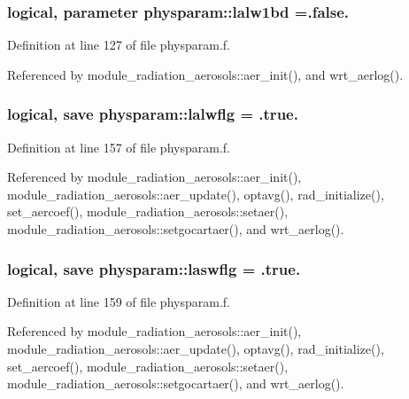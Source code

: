 \subsubsection[{\texorpdfstring{lalw1bd}{lalw1bd}}]{\setlength{\rightskip}{0pt plus 5cm}logical, parameter physparam\+::lalw1bd =.false.}\hypertarget{namespacephysparam_a7ca56a779d7583fcd17b538bf6eb8a84}{}\label{namespacephysparam_a7ca56a779d7583fcd17b538bf6eb8a84}


Definition at line 127 of file physparam.\+f.



Referenced by module\+\_\+radiation\+\_\+aerosols\+::aer\+\_\+init(), and wrt\+\_\+aerlog().

\subsubsection[{\texorpdfstring{lalwflg}{lalwflg}}]{\setlength{\rightskip}{0pt plus 5cm}logical, save physparam\+::lalwflg = .true.}\hypertarget{namespacephysparam_aeec2f09912564e297253bf32bf362928}{}\label{namespacephysparam_aeec2f09912564e297253bf32bf362928}


Definition at line 157 of file physparam.\+f.



Referenced by module\+\_\+radiation\+\_\+aerosols\+::aer\+\_\+init(), module\+\_\+radiation\+\_\+aerosols\+::aer\+\_\+update(), optavg(), rad\+\_\+initialize(), set\+\_\+aercoef(), module\+\_\+radiation\+\_\+aerosols\+::setaer(), module\+\_\+radiation\+\_\+aerosols\+::setgocartaer(), and wrt\+\_\+aerlog().

\subsubsection[{\texorpdfstring{laswflg}{laswflg}}]{\setlength{\rightskip}{0pt plus 5cm}logical, save physparam\+::laswflg = .true.}\hypertarget{namespacephysparam_aed1b9ce25d416e9149353f2075030bfa}{}\label{namespacephysparam_aed1b9ce25d416e9149353f2075030bfa}


Definition at line 159 of file physparam.\+f.



Referenced by module\+\_\+radiation\+\_\+aerosols\+::aer\+\_\+init(), module\+\_\+radiation\+\_\+aerosols\+::aer\+\_\+update(), optavg(), rad\+\_\+initialize(), set\+\_\+aercoef(), module\+\_\+radiation\+\_\+aerosols\+::setaer(), module\+\_\+radiation\+\_\+aerosols\+::setgocartaer(), and wrt\+\_\+aerlog().

